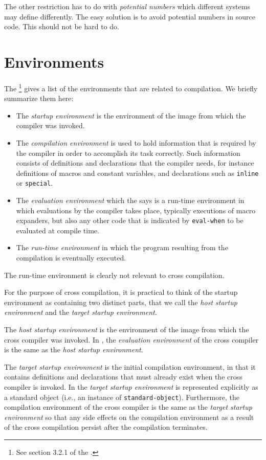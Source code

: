 The other restriction has to do with \emph{potential numbers} which
different systems may define differently.  The easy solution is to
avoid potential numbers in source code.  This should not be hard to
do. 

\section{Environments}

The \hs{}\footnote{See section 3.2.1 of the \hs{}.} gives a list of
the environments that are related to compilation.  We briefly
summarize them here:

\begin{itemize}
\item The \emph{startup environment} is the environment of the image
  from which the compiler was invoked.
\item The \emph{compilation environment} is used to hold information
  that is required by the compiler in order to accomplish its task
  correctly.  Such information consists of definitions and
  declarations that the compiler needs, for instance definitions of
  macros and constant variables,  and declarations such as
  \texttt{inline} or \texttt{special}. 
\item The \emph{evaluation environment} which the \hs{} says is a
  run-time environment in which evaluations by the compiler takes
  place, typically executions of macro expanders, but also any other
  code that is indicated by \texttt{eval-when} to be evaluated at
  compile time.
\item The \emph{run-time environment} in which the program resulting
  from the compilation is eventually executed.
\end{itemize}

The run-time environment is clearly not relevant to cross
compilation. 

For the purpose of cross compilation, it is practical to think of the
startup environment as containing two distinct parts, that we call the
\emph{host startup environment} and the \emph{target startup
  environment}.

The \emph{host startup environment} is the environment of the image
from which the cross compiler was invoked.  In \sysname{}, the
\emph{evaluation environment} of the cross compiler is the same as the
\emph{host startup environment}.

The \emph{target startup environment} is the initial compilation
environment, in that it contains definitions and declarations that
must already exist when the cross compiler is invoked.  In \sysname{}
the \emph{target startup environment} is represented explicitly as a
standard object (i.e., an instance of \texttt{standard-object}).
Furthermore, the compilation environment of the cross compiler is the
same as the \emph{target startup environment} so that any side effects
on the compilation environment as a result of the cross compilation
persist after the compilation terminates.  

